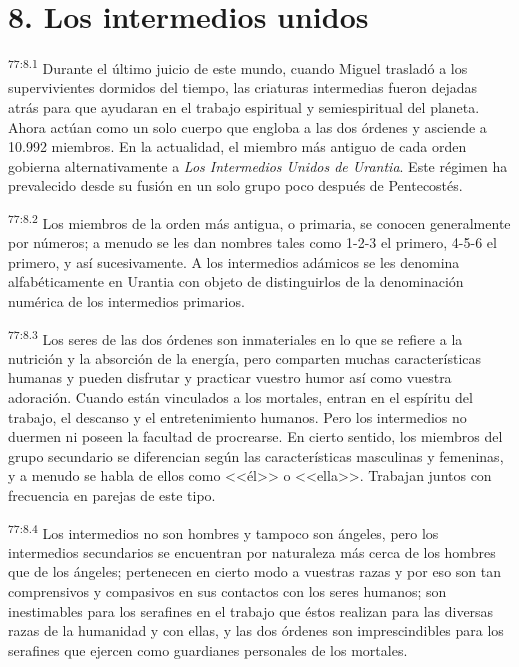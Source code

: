 \section*{8. Los intermedios unidos}
\par
\textsuperscript{77:8.1} Durante el último juicio de este mundo, cuando Miguel trasladó a los supervivientes dormidos del tiempo, las criaturas intermedias fueron dejadas atrás para que ayudaran en el trabajo espiritual y semiespiritual del planeta. Ahora actúan como un solo cuerpo que engloba a las dos órdenes y asciende a 10.992 miembros. En la actualidad, el miembro más antiguo de cada orden gobierna alternativamente a \textit{Los Intermedios Unidos de Urantia}. Este régimen ha prevalecido desde su fusión en un solo grupo poco después de Pentecostés.

\par
\textsuperscript{77:8.2} Los miembros de la orden más antigua, o primaria, se conocen generalmente por números; a menudo se les dan nombres tales como 1-2-3 el primero, 4-5-6 el primero, y así sucesivamente. A los intermedios adámicos se les denomina alfabéticamente en Urantia con objeto de distinguirlos de la denominación numérica de los intermedios primarios.

\par
\textsuperscript{77:8.3} Los seres de las dos órdenes son inmateriales en lo que se refiere a la nutrición y la absorción de la energía, pero comparten muchas características humanas y pueden disfrutar y practicar vuestro humor así como vuestra adoración. Cuando están vinculados a los mortales, entran en el espíritu del trabajo, el descanso y el entretenimiento humanos. Pero los intermedios no duermen ni poseen la facultad de procrearse. En cierto sentido, los miembros del grupo secundario se diferencian según las características masculinas y femeninas, y a menudo se habla de ellos como <<él>> o <<ella>>. Trabajan juntos con frecuencia en parejas de este tipo.

\par
\textsuperscript{77:8.4} Los intermedios no son hombres y tampoco son ángeles, pero los intermedios secundarios se encuentran por naturaleza más cerca de los hombres que de los ángeles; pertenecen en cierto modo a vuestras razas y por eso son tan comprensivos y compasivos en sus contactos con los seres humanos; son inestimables para los serafines en el trabajo que éstos realizan para las diversas razas de la humanidad y con ellas, y las dos órdenes son imprescindibles para los serafines que ejercen como guardianes personales de los mortales.

